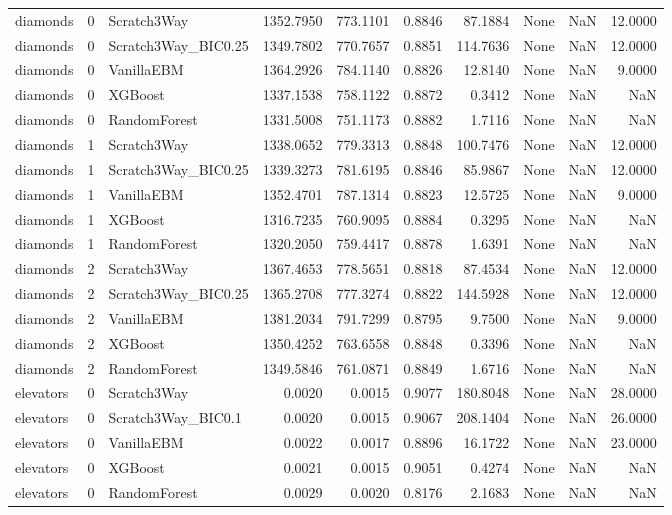 \begin{tabular}{lrlrrrrlrr}
diamonds & 0 & Scratch3Way & 1352.7950 & 773.1101 & 0.8846 & 87.1884 & None & NaN & 12.0000 \\
diamonds & 0 & Scratch3Way_BIC0.25 & 1349.7802 & 770.7657 & 0.8851 & 114.7636 & None & NaN & 12.0000 \\
diamonds & 0 & VanillaEBM & 1364.2926 & 784.1140 & 0.8826 & 12.8140 & None & NaN & 9.0000 \\
diamonds & 0 & XGBoost & 1337.1538 & 758.1122 & 0.8872 & 0.3412 & None & NaN & NaN \\
diamonds & 0 & RandomForest & 1331.5008 & 751.1173 & 0.8882 & 1.7116 & None & NaN & NaN \\
diamonds & 1 & Scratch3Way & 1338.0652 & 779.3313 & 0.8848 & 100.7476 & None & NaN & 12.0000 \\
diamonds & 1 & Scratch3Way_BIC0.25 & 1339.3273 & 781.6195 & 0.8846 & 85.9867 & None & NaN & 12.0000 \\
diamonds & 1 & VanillaEBM & 1352.4701 & 787.1314 & 0.8823 & 12.5725 & None & NaN & 9.0000 \\
diamonds & 1 & XGBoost & 1316.7235 & 760.9095 & 0.8884 & 0.3295 & None & NaN & NaN \\
diamonds & 1 & RandomForest & 1320.2050 & 759.4417 & 0.8878 & 1.6391 & None & NaN & NaN \\
diamonds & 2 & Scratch3Way & 1367.4653 & 778.5651 & 0.8818 & 87.4534 & None & NaN & 12.0000 \\
diamonds & 2 & Scratch3Way_BIC0.25 & 1365.2708 & 777.3274 & 0.8822 & 144.5928 & None & NaN & 12.0000 \\
diamonds & 2 & VanillaEBM & 1381.2034 & 791.7299 & 0.8795 & 9.7500 & None & NaN & 9.0000 \\
diamonds & 2 & XGBoost & 1350.4252 & 763.6558 & 0.8848 & 0.3396 & None & NaN & NaN \\
diamonds & 2 & RandomForest & 1349.5846 & 761.0871 & 0.8849 & 1.6716 & None & NaN & NaN \\
elevators & 0 & Scratch3Way & 0.0020 & 0.0015 & 0.9077 & 180.8048 & None & NaN & 28.0000 \\
elevators & 0 & Scratch3Way_BIC0.1 & 0.0020 & 0.0015 & 0.9067 & 208.1404 & None & NaN & 26.0000 \\
elevators & 0 & VanillaEBM & 0.0022 & 0.0017 & 0.8896 & 16.1722 & None & NaN & 23.0000 \\
elevators & 0 & XGBoost & 0.0021 & 0.0015 & 0.9051 & 0.4274 & None & NaN & NaN \\
elevators & 0 & RandomForest & 0.0029 & 0.0020 & 0.8176 & 2.1683 & None & NaN & NaN \\

\end{tabular}
